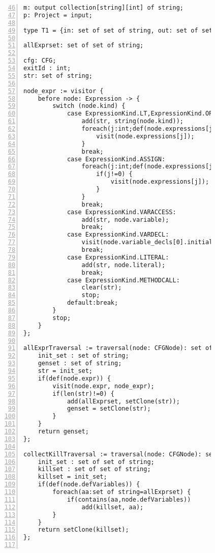 \begin{figure}[ht!]
\begin{lstlisting}[numbers=left, tabsize=4, escapechar=@, caption={Very busy expression},label={lst:vbe-code},firstline=46, firstnumber=46,lastline=101] 
m: output collection[string][int] of string;
p: Project = input;

type T1 = {in: set of set of string, out: set of set of string};

allExprset: set of set of string;

cfg: CFG;
exitId : int;
str: set of string;

node_expr := visitor {
	before node: Expression -> {
		switch (node.kind) {
			case ExpressionKind.LT,ExpressionKind.OP_ADD, ExpressionKind.OP_SUB, ExpressionKind.OP_INC, ExpressionKind.OP_MULT, ExpressionKind.OP_DIV, ExpressionKind.OP_MOD, ExpressionKind.OP_DEC, ExpressionKind.GT, ExpressionKind.EQ, ExpressionKind.NEQ, ExpressionKind.LTEQ, ExpressionKind.GTEQ, ExpressionKind.LOGICAL_NOT, ExpressionKind.LOGICAL_AND, ExpressionKind.LOGICAL_OR, ExpressionKind.BIT_AND, ExpressionKind.BIT_OR, ExpressionKind.BIT_NOT, ExpressionKind.BIT_XOR, ExpressionKind.BIT_LSHIFT, ExpressionKind.BIT_RSHIFT, ExpressionKind.BIT_UNSIGNEDRSHIFT:
				add(str, string(node.kind)); 
				foreach(j:int;def(node.expressions[j])) {
					visit(node.expressions[j]);
				}
				break;
			case ExpressionKind.ASSIGN:
				foreach(j:int;def(node.expressions[j])) {
					if(j!=0) {
						visit(node.expressions[j]);
					}
				}
				break;
			case ExpressionKind.VARACCESS:
				add(str, node.variable);
				break;
			case ExpressionKind.VARDECL:
				visit(node.variable_decls[0].initializer);
				break;
			case ExpressionKind.LITERAL:
				add(str, node.literal);
				break;
			case ExpressionKind.METHODCALL:
				clear(str);
				stop;
			default:break;
		}
		stop;
	}
};

allExprTraversal := traversal(node: CFGNode): set of string {
	init_set : set of string;
	genset : set of string;
	str = init_set;
	if(def(node.expr)) {
		visit(node.expr, node_expr);
		if(len(str)!=0) {
			add(allExprset, setClone(str));
			genset = setClone(str);
		}
	}
	return genset;
};

collectKillTraversal := traversal(node: CFGNode): set of set of string {
	init_set : set of set of string;
	killset : set of set of string;
	killset = init_set;
	if(def(node.defVariables)) {
		foreach(aa:set of string=allExprset) {
			if(contains(aa,node.defVariables))
				add(killset, aa);
		}
	}
	return setClone(killset);
};


\end{lstlisting}
\end{figure}

